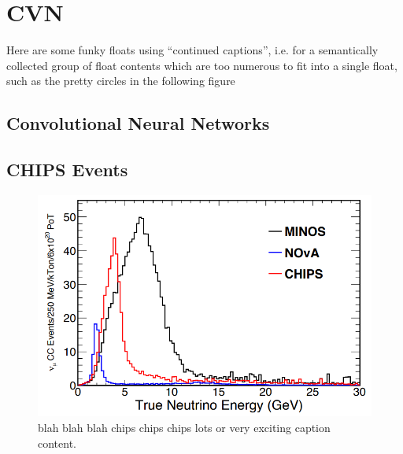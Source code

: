 \chapter{CVN}
\label{chap:cvn}

Here are some funky floats using ``continued captions'', i.e. for a semantically
collected group of float contents which are too numerous to fit into a single
float, such as the pretty circles in the following figure

\section{Convolutional Neural Networks}
\label{sec:cnn}

\section{CHIPS Events}
\label{sec:events}

\begin{figure}
    \includegraphics[width=\largefigwidth]{diagrams/cvn/numi_axis}
    \caption[numi_axis]%
    {blah blah blah chips chips chips lots or very exciting caption content.}
    \label{fig:numi_axis}
\end{figure}

